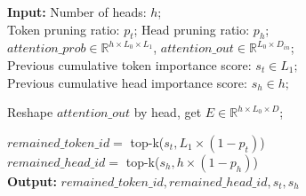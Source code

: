 \setlength{\textfloatsep}{0pt}

\begin{algorithm}[!t]
\footnotesize{
    \SetAlgoLined
    \textbf{Input:} 
    Number of heads: $h$;\\
    Token pruning ratio: $p_{t}$; Head pruning ratio: $p_{h}$;\\
    $attention\_prob \in \mathbb{R}^{ h \times L_0 \times L_1}$, 
    $attention\_out \in \mathbb{R}^{L_0 \times D_{in}}$; \\
    Previous cumulative token importance score: $s_{t} \in L_1;$ \\
    Previous cumulative head importance score: $s_{h} \in h;$
    
    Reshape $attention\_out$ by head, get $E \in \mathbb{R}^{ h \times L_0 \times D}$;
    
    $remained\_token\_id = $ top-k($s_t, L_1 \times (1-p_t)$) \\
    $remained\_head\_id = $ top-k($s_h, h \times (1-p_h)$) \\
    
    \textbf{Output:} $remained\_token\_id, remained\_head\_id, s_t, s_h$
    
    \caption{Token and Head Pruning (one layer)}
}
    \label{algo:cascade}
\afterpage{\global\setlength{\textfloatsep}{\oldtextfloatsep}}
\end{algorithm}


